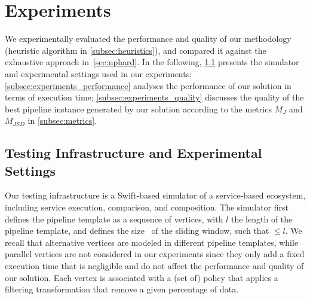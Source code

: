 \section{Experiments}\label{sec:experiment}
We experimentally evaluated the performance and quality of our methodology (heuristic algorithm in \cref{subsec:heuristics}), and compared it against the exhaustive approach in~\cref{sec:nphard}. In the following,
\cref{subsec:experiments_infrastructure} presents the simulator and experimental settings used in our experiments;
\cref{subsec:experiments_performance} analyses the performance of our solution in terms of execution time; \cref{subsec:experiments_quality} discusses the quality of the best pipeline instance generated by our solution according to the metrics $M_J$ and $M_{JSD}$ in \cref{subsec:metrics}.

\subsection{Testing Infrastructure and Experimental Settings}\label{subsec:experiments_infrastructure}
Our testing infrastructure is a Swift-based simulator of a service-based ecosystem, including service execution, comparison, and composition. The simulator first defines the pipeline template as a sequence of vertices, with $l$ the length of the pipeline template, and defines the size \windowsize\ of the sliding window, such that \windowsize$\leq$$l$. We recall that alternative vertices are modeled in different pipeline templates, while parallel vertices are not considered in our experiments since they only add a fixed execution time that is negligible and do not affect the performance and quality of our solution. Each vertex is associated with a (set of) policy that applies a filtering transformation that remove a given percentage of data.

